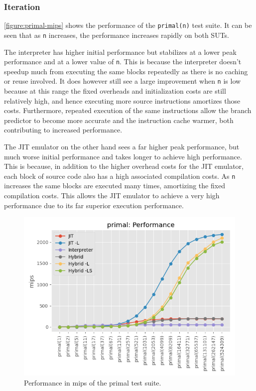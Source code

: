 \subsubsection{Iteration}
\label{section:perf-iteration}


\autoref{figure:primal-mips} shows the performance of the \texttt{primal(n)} test suite. It can be seen that as \texttt{n} increases, the performance increases rapidly on both SUTs.

The interpreter has higher initial performance but stabilizes at a lower peak performance and at a lower value of \texttt{n}. This is because the interpreter doesn't speedup much from executing the same blocks repeatedly as there is no caching or reuse involved. It does however still see a large improvement when \texttt{n} is low because at this range the fixed overheads and initialization costs are still relatively high, and hence executing more source instructions amortizes those costs. Furthermore, repeated execution of the same instructions allow the branch predictor to become more accurate and the instruction cache warmer, both contributing to increased performance.

The JIT emulator on the other hand sees a far higher peak performance, but much worse initial performance and takes longer to achieve high performance. This is because, in addition to the higher overhead costs for the JIT emulator, each block of source code also has a high associated compilation costs. As \texttt{n} increases the same blocks are executed many times, amortizing the fixed compilation costs. This allows the JIT emulator to achieve a very high performance due to its far superior execution performance.

\begin{figure}[H]
    \centering
    \includegraphics[scale=0.75]{output/graphs/tests/all/primal/mips.png}
    \caption{Performance in mips of the primal test suite.}
    \label{figure:primal-mips}
\end{figure}

